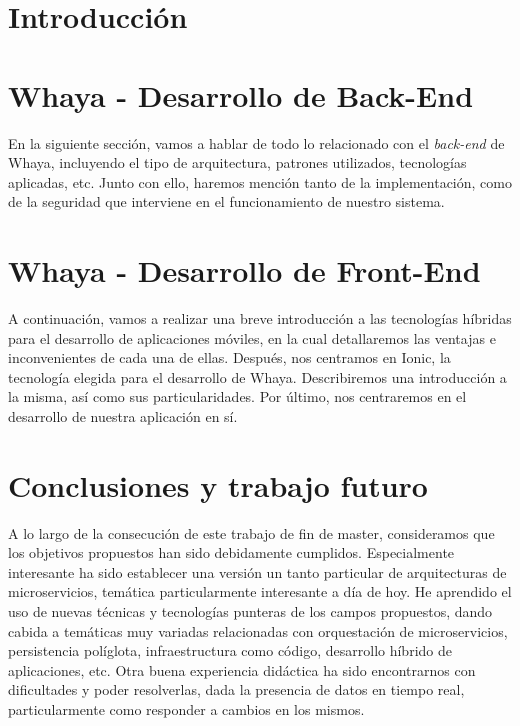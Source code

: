 \documentclass[final,2p,12pt]{elsarticle}
\begin{document}
\section{Introducción}

\newpage
\section{Whaya - Desarrollo de Back-End}
En la siguiente sección, vamos a hablar de todo lo relacionado con el \textit{back-end} de Whaya, incluyendo el tipo de arquitectura, patrones utilizados, tecnologías aplicadas, etc. Junto con ello, haremos mención tanto de la implementación, como de la seguridad que interviene
en el funcionamiento de nuestro sistema.

\newpage
\section{Whaya - Desarrollo de Front-End}
A continuación, vamos a realizar una breve introducción a las tecnologías híbridas para el desarrollo de aplicaciones móviles, en la cual detallaremos las ventajas e inconvenientes de cada una de ellas. Después, nos centramos en Ionic, la tecnología elegida para el desarrollo de Whaya. Describiremos una introducción a la misma, así como sus particularidades. Por último, nos centraremos en el desarrollo de nuestra aplicación en sí. 

\newpage
\section{Conclusiones y trabajo futuro}
\noindent
A lo largo de la consecución de este trabajo de fin de master, consideramos que los objetivos propuestos han sido debidamente cumplidos.
Especialmente interesante ha sido establecer una versión un tanto particular de arquitecturas de microservicios, temática particularmente
interesante a día de hoy. He aprendido el uso de nuevas técnicas y tecnologías punteras de los campos propuestos, dando cabida a temáticas
muy variadas relacionadas con orquestación de microservicios, persistencia políglota, infraestructura como código, desarrollo híbrido de aplicaciones, etc.
Otra buena experiencia didáctica ha sido encontrarnos con dificultades y poder resolverlas, dada la presencia de datos en tiempo real, particularmente como responder a cambios en los mismos.
\end{document}
